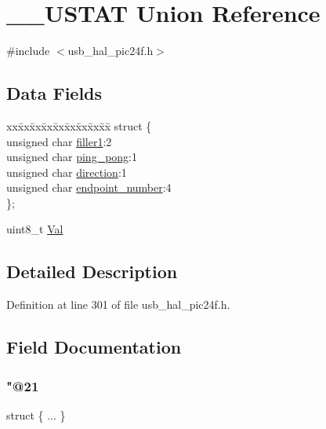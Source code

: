 \hypertarget{union_____u_s_t_a_t}{}\section{\+\_\+\+\_\+\+U\+S\+T\+AT Union Reference}
\label{union_____u_s_t_a_t}


{\ttfamily \#include $<$usb\+\_\+hal\+\_\+pic24f.\+h$>$}

\subsection*{Data Fields}
\begin{DoxyCompactItemize}
\item 
\begin{tabbing}
xx\=xx\=xx\=xx\=xx\=xx\=xx\=xx\=xx\=\kill
struct \{\\
\>unsigned char \mbox{\hyperlink{union_____u_s_t_a_t_a54acb45d462e0ff47705a7514916273d}{filler1}}:2\\
\>unsigned char \mbox{\hyperlink{union_____u_s_t_a_t_a9ec468b66f0444dc9be4ec11f75a0a5f}{ping\_pong}}:1\\
\>unsigned char \mbox{\hyperlink{union_____u_s_t_a_t_a4c9b82152ef06a9d3b78f60779cd4b85}{direction}}:1\\
\>unsigned char \mbox{\hyperlink{union_____u_s_t_a_t_a4f411fec039d172f03e2a41d46ff58ca}{endpoint\_number}}:4\\
\}; \\

\end{tabbing}\item 
uint8\+\_\+t \mbox{\hyperlink{union_____u_s_t_a_t_aa0c179f4462bb12ca1ed40d18c89cda1}{Val}}
\end{DoxyCompactItemize}


\subsection{Detailed Description}


Definition at line 301 of file usb\+\_\+hal\+\_\+pic24f.\+h.



\subsection{Field Documentation}
\mbox{\label{union_____u_s_t_a_t_aa6e231ab3d4f8ac20c9d9870e312e7da}} 
\subsubsection{\texorpdfstring{"@21}{@21}}
{\footnotesize\ttfamily struct \{ ... \} }

